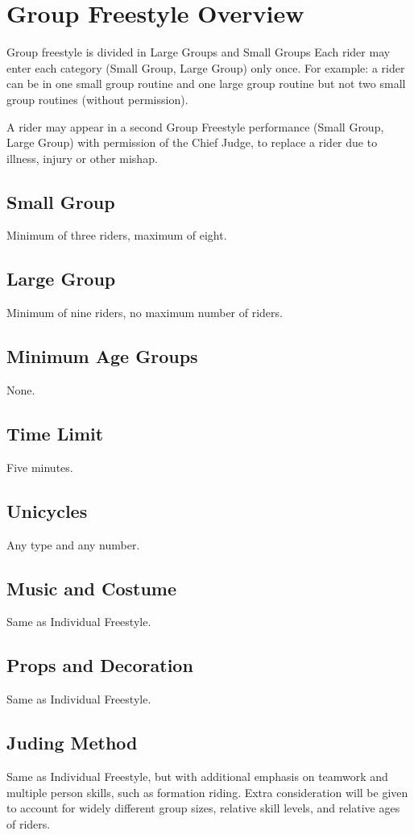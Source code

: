\section{Group Freestyle Overview}
Group freestyle is divided in Large Groups and Small Groups 
Each rider may enter each category (Small Group, Large Group) only once. For example: a rider can be in one small group routine and one large group routine but not two small group routines (without permission).

A rider may appear in a second Group Freestyle performance (Small Group, Large Group) with permission of the Chief Judge, to replace a rider due to illness, injury or other mishap. 

\subsection{Small Group}
Minimum of three riders, maximum of eight.

\subsection{Large Group}
Minimum of nine riders, no maximum number of riders.

\subsection{Minimum Age Groups}
None.

\subsection{Time Limit}
Five minutes.

\subsection{Unicycles}
Any type and any number.

\subsection{Music and Costume}
Same as Individual Freestyle.

\subsection{Props and Decoration}
Same as Individual Freestyle.

\subsection{Juding Method}
Same as Individual Freestyle, but with additional emphasis on teamwork and multiple person skills, such as formation riding.
Extra consideration will be given to account for widely different group sizes, relative skill levels, and relative ages of riders.

